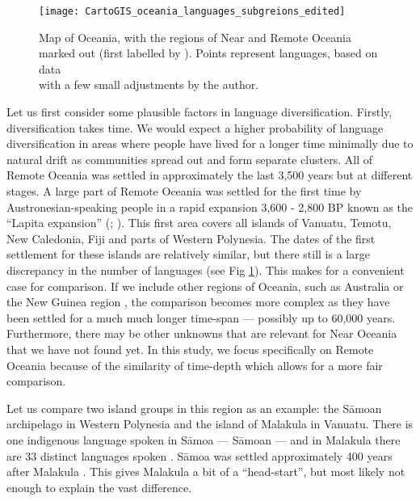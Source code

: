 \documentclass[unnumsec,webpdf,modern,medium]{oup-authoring-template}
\begin{document}
\begin{figure}
\centering
\texttt{[image: CartoGIS\_oceania\_languages\_subgreions\_edited]}
\caption{Map of Oceania, with the regions of Near and Remote Oceania marked out (first labelled by \citet{pawley1973dating}). Points represent languages, based on data \citet{glottolog3} \\with a few small adjustments by the author.} 
\label{RO_overnight_coloured_dots}
\end{figure}

Let us first consider some plausible factors in language diversification. Firstly, diversification takes time. We would expect a higher probability of language diversification in areas where people have lived for a longer time minimally due to natural drift as communities spread out and form separate clusters. All of Remote Oceania was settled in approximately the last 3,500 years but at different stages. A large part of Remote Oceania was settled for the first time by Austronesian-speaking people in a rapid expansion 3,600 - 2,800 BP known as the ``Lapita expansion'' (\citet[106-7]{bellwood2006austronesians}; \citet[137]{rieth_cochrane_2018}). This first area covers all islands of Vanuatu, Temotu, New Caledonia, Fiji and parts of Western Polynesia. The dates of the first settlement for these islands are relatively similar, but there still is a large discrepancy in the number of languages (see Fig \ref{RO_overnight_coloured_dots}). This makes for a convenient case for comparison. If we include other regions of Oceania, such as Australia or the New Guinea region \citep{ross2017_new_guinea_region}, the comparison becomes more complex as they have been settled for a much much longer time-span --- possibly up to 60,000 years. Furthermore, there may be other unknowns that are relevant for Near Oceania that we have not found yet. In this study, we focus specifically on Remote Oceania because of the similarity of time-depth which allows for a more fair comparison.

Let us compare two island groups in this region as an example: the S\={a}moan archipelago in Western Polynesia and the island of Malakula in Vanuatu. There is one indigenous language spoken in S\={a}moa ---  S\={a}moan --- and in Malakula there are 33 distinct languages spoken \citep{glottolog3}. S\={a}moa was settled approximately 400 years after Malakula \citep[137-8]{rieth_cochrane_2018}. This gives Malakula a bit of a ``head-start'', but most likely not enough to explain the vast difference.
\end{document}
